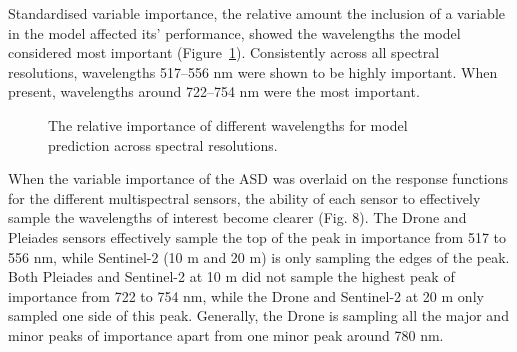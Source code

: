 \documentclass[
  letterpaper,
  11pt,
  english,
  singlespacing,
  headsepline]{MastersDoctoralThesis}
\begin{document}
\begin{spacing}{1.5}
\begin{table}
{}

\end{table}%

Standardised variable importance, the relative amount the inclusion of a
variable in the model affected its' performance, showed the wavelengths
the model considered most important (Figure~\ref{fig-VIPFIG}).
Consistently across all spectral resolutions, wavelengths 517--556 nm
were shown to be highly important. When present, wavelengths around
722--754 nm were the most important.

\begin{figure}


\caption{\label{fig-VIPFIG}The relative importance of different
wavelengths for model prediction across spectral resolutions.}

\end{figure}%

When the variable importance of the ASD was overlaid on the response
functions for the different multispectral sensors, the ability of each
sensor to effectively sample the wavelengths of interest become clearer
(Fig. 8). The Drone and Pleiades sensors effectively sample the top of
the peak in importance from 517 to 556 nm, while Sentinel-2 (10 m and 20
m) is only sampling the edges of the peak. Both Pleiades and Sentinel-2
at 10 m did not sample the highest peak of importance from 722 to 754
nm, while the Drone and Sentinel-2 at 20 m only sampled one side of this
peak. Generally, the Drone is sampling all the major and minor peaks of
importance apart from one minor peak around 780 nm.


\end{spacing}
\end{document}
